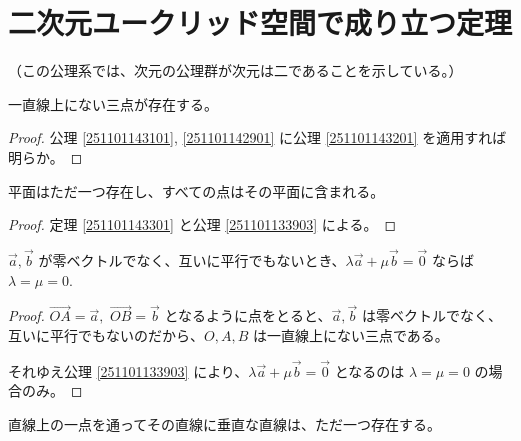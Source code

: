 \chapter{二次元ユークリッド空間で成り立つ定理}

（この公理系では、次元の公理群が次元は二であることを示している。）

\begin{thm}\label{251101143301}
  一直線上にない三点が存在する。
\end{thm}

\begin{proof}
  公理 \ref{251101143101}, \ref{251101142901} に公理 \ref{251101143201} を適用すれば明らか。
\end{proof}

\begin{thm}
  平面はただ一つ存在し、すべての点はその平面に含まれる。
\end{thm}

\begin{proof}
  定理 \ref{251101143301} と公理 \ref{251101133903} による。
\end{proof}

\begin{thm}\label{251101143401}
 \(\vec{a},\vec{b}\) が零ベクトルでなく、互いに平行でもないとき、\(\lambda\vec{a}+\mu\vec{b}=\vec{0}\) ならば \(\lambda=\mu=0.\)
\end{thm}

\begin{proof}
  \(\overrightarrow{OA}=\vec{a},\) \(\overrightarrow{OB}=\vec{b}\) となるように点をとると、\(\vec{a},\vec{b}\) は零ベクトルでなく、互いに平行でもないのだから、\(O,A,B\) は一直線上にない三点である。

  それゆえ公理 \ref{251101133903} により、\(\lambda\vec{a}+\mu\vec{b}=\vec{0}\) となるのは \(\lambda=\mu=0\) の場合のみ。
\end{proof}

\begin{thm}
  直線上の一点を通ってその直線に垂直な直線は、ただ一つ存在する。
\end{thm}

